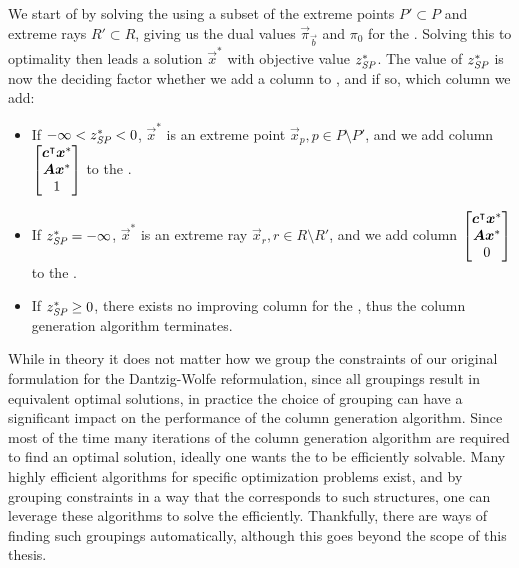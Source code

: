 We start of by solving the \RMP{} using a subset of the extreme points $P' \subset P$ and extreme rays $R' \subset R$, giving us the dual values $\vec{\pi}_\vec{b}$ and $\pi_0$ for the \SP{}. Solving this \SP{} to optimality then leads a solution $\vec{x}^*$ with objective value $z^*_\SP{}$. The value of $z^*_\SP{}$ is now the deciding factor whether we add a column to \RMP{}, and if so, which column we add:
\begin{itemize}
\item If $-\infty < z^*_\SP{} < 0$, $\vec{x}^*$ is an extreme point $\vec{x}_p, p \in P \setminus P'$, and we add column $\begin{bmatrix} {\bm{c}}^\intercal {\bm{x}}^* \\ {\bm{A}} {\bm{x}}^* \\ 1 \end{bmatrix}$ to the \RMP{}.
\item If $z^*_\SP{} = -\infty$, $\vec{x}^*$ is an extreme ray $\vec{x}_r, r \in R \setminus R'$, and we add column $\begin{bmatrix} {\bm{c}}^\intercal {\bm{x}}^* \\ {\bm{A}} {\bm{x}}^* \\ 0 \end{bmatrix}$ to the \RMP{}.
\item If $z^*_\SP{} \geq 0$, there exists no improving column for the \RMP{}, thus the column generation algorithm terminates.
\end{itemize}

While in theory it does not matter how we group the constraints of our original formulation \LP{} for the Dantzig-Wolfe reformulation, since all groupings result in equivalent optimal solutions, in practice the choice of grouping can have a significant impact on the performance of the column generation algorithm. Since most of the time many iterations of the column generation algorithm are required to find an optimal solution, ideally one wants the \SP{} to be efficiently solvable. Many highly efficient algorithms for specific optimization problems exist, and by grouping constraints in a way that the \SP{} corresponds to such structures, one can leverage these algorithms to solve the \SP{} efficiently. Thankfully, there are ways of finding such groupings automatically, although this goes beyond the scope of this thesis.
